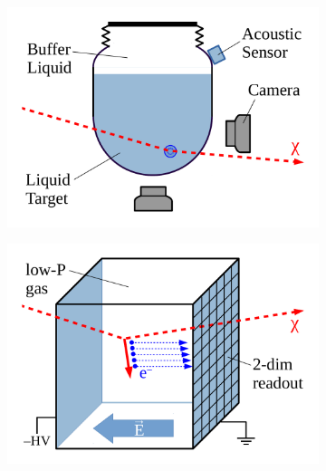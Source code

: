 \begin{figure}[!h]
\begin{subfigure}{0.49\textwidth}
         \includegraphics[width=\textwidth]{figures/DMOverview/bubble.pdf}
         \caption{}
         \label{fig:DMOverview/bubble}
     \end{subfigure}
     \hfill
     \begin{subfigure}{0.49\textwidth}
         \centering
         \includegraphics[width=\textwidth]{figures/DMOverview/directional.pdf}
         \caption{}
         \label{fig:DMOverview/directional}
     \end{subfigure}
     \hfill
     \begin{subfigure}{0.49\textwidth}
         \centering

\end{subfigure}
\end{figure}
